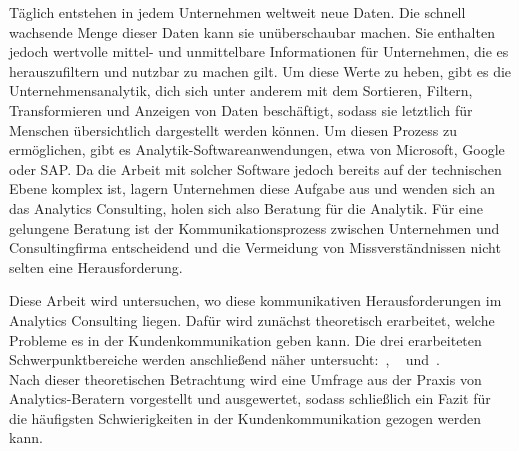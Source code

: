 \documentclass[../main.tex]{subfiles}
\begin{document}
Täglich entstehen in jedem Unternehmen weltweit neue Daten.
Die schnell wachsende Menge dieser Daten kann sie unüberschaubar machen.
Sie enthalten jedoch wertvolle mittel- und unmittelbare Informationen für Unternehmen, die es herauszufiltern und nutzbar zu machen gilt.
Um diese Werte zu heben, gibt es die Unternehmensanalytik, dich sich unter anderem mit dem Sortieren, Filtern, Transformieren und Anzeigen von Daten beschäftigt, sodass sie letztlich für Menschen übersichtlich dargestellt werden können.
Um diesen Prozess zu ermöglichen, gibt es Analytik-Softwareanwendungen, etwa von Microsoft, Google oder SAP.\@
Da die Arbeit mit solcher Software jedoch bereits auf der technischen Ebene komplex ist, lagern Unternehmen diese Aufgabe aus und wenden sich an das Analytics Consulting, holen sich also Beratung für die Analytik.
Für eine gelungene Beratung ist der Kommunikationsprozess zwischen Unternehmen und Consultingfirma entscheidend und die Vermeidung von Missverständnissen nicht selten eine Herausforderung.
 
Diese Arbeit wird untersuchen, wo diese kommunikativen Herausforderungen im Analytics Consulting liegen.
Dafür wird zunächst theoretisch erarbeitet, welche Probleme es in der Kundenkommunikation geben kann. Die drei erarbeiteten Schwerpunktbereiche werden anschließend näher untersucht:~, ~ und~.
\\
Nach dieser theoretischen Betrachtung wird eine Umfrage aus der Praxis von Analytics-Beratern vorgestellt und ausgewertet, sodass schließlich ein Fazit für die häufigsten Schwierigkeiten in der Kundenkommunikation gezogen werden kann.
\end{document}
